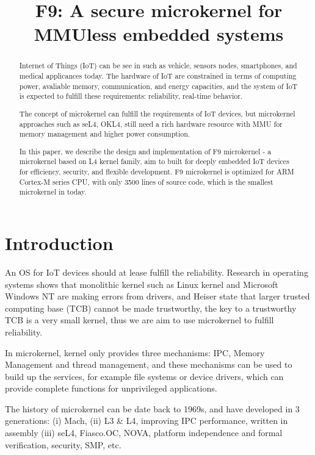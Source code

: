 \documentclass[10pt,preprint,nocopyrightspace]{sigplanconf}
\date{}
\begin{document}
\title{F9: A secure microkernel for MMUless embedded systems}
\maketitle

\begin{abstract}\textsl{}
	
Internet of Things (IoT) can be see in such as vehicle, sensors nodes, smartphones, and medical applicances today. The hardware of IoT are constrained in terms of computing power, avaliable memory, communication, and energy capacities, and the system of IoT is expected to fulfill these requirements: reliability, real-time behavior. 

The concept of microkernel can fulfill the requirements of IoT devices, but microkernel approaches such as seL4, OKL4, still need a rich hardware resource with MMU for memory management and higher power consumption.

In this paper, we describe the design and implementation of F9 microkernel - a microkernel based on L4 kernel family, aim to built for deeply embedded IoT devices for efficiency, security, and flexible development. F9 microkernel is optimized for ARM Cortex-M series CPU, with only 3500 lines of source code, which is the smallest microkernel in today.

\end{abstract}

\section{Introduction}

An OS for IoT devices should at lease fulfill the reliability\cite{baccelli2013riot}. Research in operating systems shows that monolithic kernel such as Linux kernel\cite{chou2001empirical} and Microsoft Windows NT\cite{swift2005improving} are making errors from drivers, and Heiser state that larger trusted computing base (TCB) cannot be made trustworthy, the key to a trustworthy TCB is a very small kernel\cite{heiser2005secure}, thus we are aim to use microkernel to fulfill reliability.

In microkernel, kernel only provides three mechanisms: IPC, Memory Management and thread management, and these mechanisms can be used to build up the services, for example file systems or device drivers, which can provide complete functions for unprivileged applications. 

The history of microkernel can be date back to 1969s, and have developed in 3 generations: (i) Mach, (ii) L3 \& L4, improving IPC performance, written in assembly (iii) seL4, Fiasco.OC, NOVA, platform independence and formal verification, security, SMP, etc. 
\end{document}
